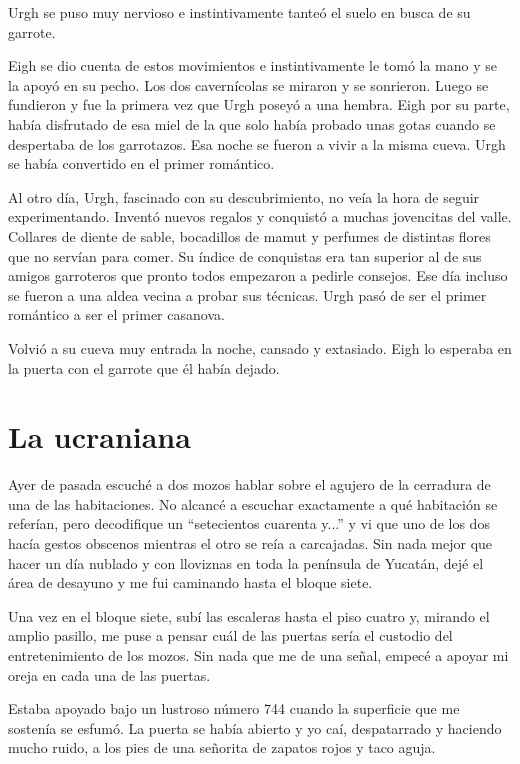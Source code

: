 \documentclass[12pt,twoside,openright,a6paper]{book}
\begin{document}
Urgh se puso muy nervioso e instintivamente tanteó el suelo en busca de su garrote.

Eigh se dio cuenta de estos movimientos e instintivamente le tomó la mano y se la apoyó en su pecho. Los dos cavernícolas se miraron y se sonrieron. Luego se fundieron y fue la primera vez que Urgh poseyó a una hembra. Eigh por su parte, había disfrutado de esa miel de la que solo había probado unas gotas cuando se despertaba de los garrotazos. Esa noche se fueron a vivir a la misma cueva. Urgh se había convertido en el primer romántico.

Al otro día, Urgh, fascinado con su descubrimiento, no veía la hora de seguir experimentando. Inventó nuevos regalos y conquistó a muchas jovencitas del valle. Collares de diente de sable, bocadillos de mamut y perfumes de distintas flores que no servían para comer. Su índice de conquistas era tan superior al de sus amigos garroteros que pronto todos empezaron a pedirle consejos. Ese día incluso se fueron a una aldea vecina a probar sus técnicas. Urgh pasó de ser el primer romántico a ser el primer casanova. 

Volvió a su cueva muy entrada la noche, cansado y extasiado. Eigh lo esperaba en la puerta con el garrote que él había dejado.

\chapter*{La ucraniana}


Ayer de pasada escuché a dos mozos hablar sobre el agujero de la cerradura de
una de las habitaciones. No alcancé a escuchar exactamente a qué habitación
se referían, pero decodifique un “setecientos cuarenta y...” y vi que uno
de los dos hacía gestos obscenos mientras el otro se reía a carcajadas. Sin
nada mejor que hacer un día nublado y con lloviznas en toda la península de
Yucatán, dejé el área de desayuno y me fui caminando hasta el bloque siete.

Una vez en el bloque siete, subí las escaleras hasta el piso cuatro y,
mirando el amplio pasillo, me puse a pensar cuál de las puertas sería el
custodio del entretenimiento de los mozos. Sin nada que me de una señal,
empecé a apoyar mi oreja en cada una de las puertas.

Estaba apoyado bajo un lustroso número 744 cuando la superficie que me
sostenía se esfumó. La puerta se había abierto y yo caí, despatarrado
y haciendo mucho ruido, a los pies de una señorita de zapatos rojos y
taco aguja.
\end{document}
